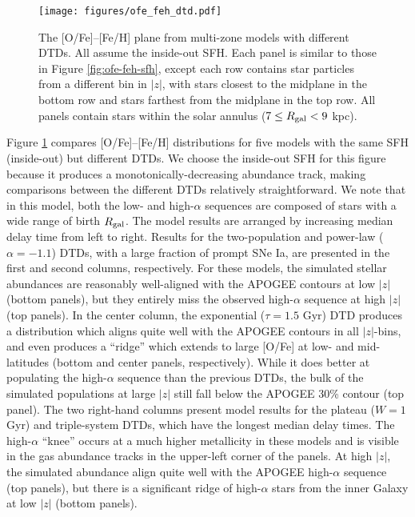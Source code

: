 \documentclass[twocolumn,twocolappendix,linenumbers,trackchanges]{aastex631}
\begin{document}
\begin{figure*}
    \centering
    \texttt{[image: figures/ofe\_feh\_dtd.pdf]}
    \caption{The [O/Fe]--[Fe/H] plane from multi-zone models with different DTDs. All assume the inside-out SFH. Each panel is similar to those in Figure \ref{fig:ofe-feh-sfh}, except each row contains star particles from a different bin in $|z|$, with stars closest to the midplane in the bottom row and stars farthest from the midplane in the top row. All panels contain stars within the solar annulus ($7\leq R_{\rm gal}<9$ kpc).}
    \label{fig:ofe-feh-dtd}
\end{figure*}

Figure \ref{fig:ofe-feh-dtd} compares [O/Fe]--[Fe/H] distributions for five models with the same SFH (inside-out) but different DTDs. We choose the inside-out SFH for this figure because it produces a monotonically-decreasing abundance track, making comparisons between the different DTDs relatively straightforward. We note that in this model, both the low- and high-$\alpha$ sequences are composed of stars with a wide range of birth $R_{\rm gal}$. The model results are arranged by increasing median delay time from left to right. Results for the two-population and power-law ($\alpha=-1.1$) DTDs, with a large fraction of prompt SNe Ia, are presented in the first and second columns, respectively. For these models, the simulated stellar abundances are reasonably well-aligned with the APOGEE contours at low $|z|$ (bottom panels), but they entirely miss the observed high-$\alpha$ sequence at high $|z|$ (top panels). In the center column, the exponential ($\tau=1.5$ Gyr) DTD produces a distribution which aligns quite well with the APOGEE contours in all $|z|$-bins, and even produces a ``ridge'' which extends to large [O/Fe] at low- and mid-latitudes (bottom and center panels, respectively). While it does better at populating the high-$\alpha$ sequence than the previous DTDs, the bulk of the simulated populations at large $|z|$ still fall below the APOGEE 30\% contour (top panel). The two right-hand columns present model results for the plateau ($W=1$ Gyr) and triple-system DTDs, which have the longest median delay times. The high-$\alpha$ ``knee'' occurs at a much higher metallicity in these models and is visible in the gas abundance tracks in the upper-left corner of the panels. At high $|z|$, the simulated abundance align quite well with the APOGEE high-$\alpha$ sequence (top panels), but there is a significant ridge of high-$\alpha$ stars from the inner Galaxy at low $|z|$ (bottom panels).
\end{document}
